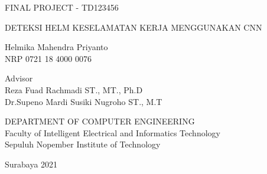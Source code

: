 FINAL PROJECT - TD123456

\vspace{6ex}

\begin{large}
  DETEKSI HELM KESELAMATAN KERJA MENGGUNAKAN CNN
\end{large}

\vspace{4ex}

Helmika Mahendra Priyanto \\
NRP 0721 18 4000 0076

\vspace{2ex}

Advisor \\
Reza Fuad Rachmadi ST., MT., Ph.D \\
Dr.Supeno Mardi Susiki Nugroho ST., M.T

\vspace{6ex}

DEPARTMENT OF COMPUTER ENGINEERING \\
Faculty of Intelligent Electrical and Informatics Technology \\
Sepuluh Nopember Institute of Technology

Surabaya 2021
